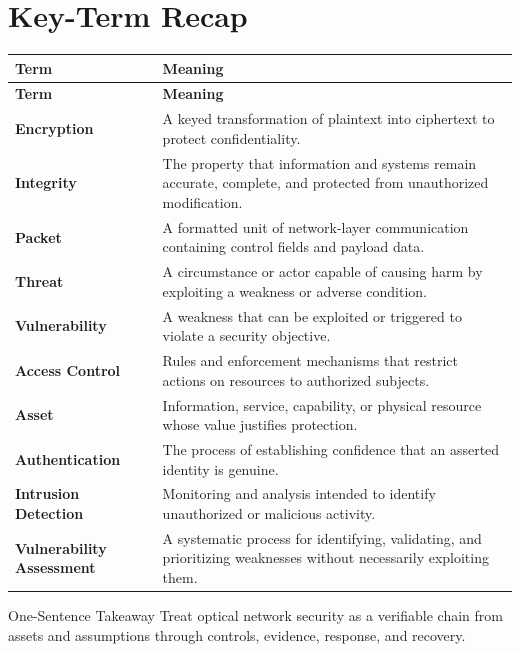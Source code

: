 \documentclass[11pt,letterpaper]{article}
\begin{document}
\section*{Key-Term Recap}
\begin{longtable}{>{\raggedright\arraybackslash}p{}>{\raggedright\arraybackslash}p{}}
\toprule\rowcolor{Navy}\color{white}\textbf{Term} & \color{white}\textbf{Meaning}\\\midrule
\endfirsthead
\toprule\rowcolor{Navy}\color{white}\textbf{Term} & \color{white}\textbf{Meaning}\\\midrule
\endhead
\textbf{Encryption} & A keyed transformation of plaintext into ciphertext to protect confidentiality. \\\midrule
\textbf{Integrity} & The property that information and systems remain accurate, complete, and protected from unauthorized modification. \\\midrule
\textbf{Packet} & A formatted unit of network-layer communication containing control fields and payload data. \\\midrule
\textbf{Threat} & A circumstance or actor capable of causing harm by exploiting a weakness or adverse condition. \\\midrule
\textbf{Vulnerability} & A weakness that can be exploited or triggered to violate a security objective. \\\midrule
\textbf{Access Control} & Rules and enforcement mechanisms that restrict actions on resources to authorized subjects. \\\midrule
\textbf{Asset} & Information, service, capability, or physical resource whose value justifies protection. \\\midrule
\textbf{Authentication} & The process of establishing confidence that an asserted identity is genuine. \\\midrule
\textbf{Intrusion Detection} & Monitoring and analysis intended to identify unauthorized or malicious activity. \\\midrule
\textbf{Vulnerability Assessment} & A systematic process for identifying, validating, and prioritizing weaknesses without necessarily exploiting them. \\\midrule
\bottomrule
\end{longtable}
\begin{CornellExamBox}{One-Sentence Takeaway}
Treat optical network security as a verifiable chain from assets and assumptions through controls, evidence, response, and recovery.
\end{CornellExamBox}
\end{document}
